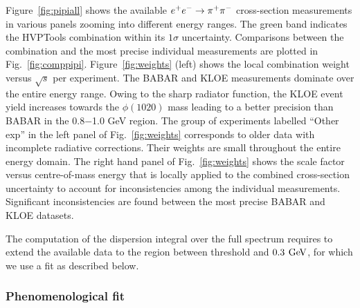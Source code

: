 Figure~\ref{fig:pipiall} shows the available $e^+e^-\to\pi^+\pi^-$ cross-section measurements in various panels zooming into different energy ranges. The green band indicates the HVPTools combination within its $1\sigma$ uncertainty. Comparisons between the combination and the most precise individual measurements are plotted in Fig.~\ref{fig:comppipi}. Figure~\ref{fig:weights} (left) shows the local combination weight versus $\sqrt{s}$ per experiment. The BABAR and KLOE measurements dominate over the entire energy range. Owing to the sharp radiator function, the KLOE event yield  increases towards the $\phi(1020)$ mass leading to a better precision than BABAR in the 0.8$-$1.0 GeV region. The group of experiments labelled ``Other exp'' in the left panel of Fig.~\ref{fig:weights} corresponds to older data with incomplete radiative corrections. Their weights are small throughout the entire energy domain. The right hand panel of Fig.~\ref{fig:weights} shows the scale factor versus centre-of-mass energy that is locally applied to the combined  \pp cross-section uncertainty to account for inconsistencies among the individual measurements. Significant inconsistencies are found between the most precise BABAR and KLOE datasets. 

The computation of the dispersion integral over the full \pp spectrum requires to extend the available data to the region between threshold and $0.3\:\mathrm{\,Ge\kern -0.1em V}$, for which we use a fit as described below.


\subsubsection*{Phenomenological fit}

